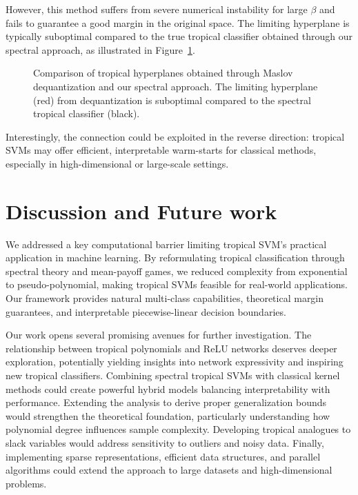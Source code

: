 \documentclass{article}
\begin{document}
However, this method suffers from severe numerical instability for large $\beta$ and fails to guarantee a good margin in the original space. The limiting hyperplane is typically suboptimal compared to the true tropical classifier obtained through our spectral approach, as illustrated in Figure~\ref{fig:maslov_dequantization}.

\begin{figure}[h]
    \centering
    \resizebox{0.5\textwidth}{!}{\clipbox{0.15\width{} 0.15\height{} 0.15\width{} 0.15\height{}}{}}
    \caption{Comparison of tropical hyperplanes obtained through Maslov dequantization and our spectral approach. The limiting hyperplane (red) from dequantization is suboptimal compared to the spectral tropical classifier (black).}
    \label{fig:maslov_dequantization}
\end{figure}

Interestingly, the connection could be exploited in the reverse direction: tropical SVMs may offer efficient, interpretable warm-starts for classical methods, especially in high-dimensional or large-scale settings.

\section{Discussion and Future work}\label{sec:discussion}

We addressed a key computational barrier limiting tropical SVM's practical application in machine learning. By reformulating tropical classification through spectral theory and mean-payoff games, we reduced complexity from exponential to pseudo-polynomial, making tropical SVMs feasible for real-world applications. Our framework provides natural multi-class capabilities, theoretical margin guarantees, and interpretable piecewise-linear decision boundaries.

Our work opens several promising avenues for further investigation. The relationship between tropical polynomials and ReLU networks deserves deeper exploration, potentially yielding insights into network expressivity and inspiring new tropical classifiers. Combining spectral tropical SVMs with classical kernel methods could create powerful hybrid models balancing interpretability with performance. Extending the analysis to derive proper generalization bounds would strengthen the theoretical foundation, particularly understanding how polynomial degree influences sample complexity. Developing tropical analogues to slack variables would address sensitivity to outliers and noisy data. Finally, implementing sparse representations, efficient data structures, and parallel algorithms could extend the approach to large datasets and high-dimensional problems.
\end{document}
